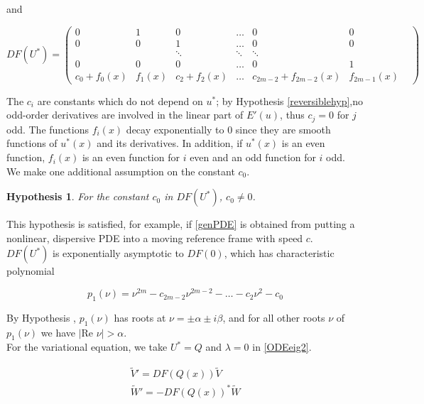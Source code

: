 \documentclass[12pt]{article}
\newtheorem{hypothesis}{Hypothesis}
\begin{document}
and 

\begin{equation}
DF(U^*) = \begin{pmatrix}
0 & 1 & 0 & \dots & 0 & 0 \\
0 & 0 & 1 & \dots & 0 & 0 \\
& & \ddots & \ddots & \ddots & & \\
0 & 0 & 0 & \dots & 0 & 1 \\
c_0 + f_0(x) & f_1(x) & c_2 + f_2(x) &
 \dots & c_{2m-2} + f_{2m-2}(x) & f_{2m-1}(x)
\end{pmatrix}
\end{equation}

The $c_i$ are constants which do not depend on $u^*$; by Hypothesis \ref{reversiblehyp},no odd-order derivatives are involved in the linear part of $E'(u)$, thus $c_j = 0$ for $j$ odd. The functions $f_i(x)$ decay exponentially to 0 since they are smooth functions of $u^*(x)$ and its derivatives. In addition, if $u^*(x)$ is an even function, $f_i(x)$ is an even function for $i$ even and an odd function for $i$ odd.\\

We make one additional assumption on the constant $c_0$.

\begin{hypothesis}\label{c0nonzero}
For the constant $c_0$ in $DF(U^*)$, $c_0 \neq 0$.
\end{hypothesis}

This hypothesis is satisfied, for example, if \eqref{genPDE} is obtained from putting a nonlinear, dispersive PDE into a moving reference frame with speed $c$. \\

$DF(U^*)$ is exponentially asymptotic to $DF(0)$, which has characteristic polynomial

\begin{equation}\label{charpolyDF0}
p_1(\nu) = \nu^{2m} - c_{2m-2} \nu^{2m-2} - \dots - c_2 \nu^2 - c_0
\end{equation}

By Hypothesis \label{hypeq}, $p_1(\nu)$ has roots at $\nu = \pm \alpha \pm i \beta$, and for all other roots $\nu$ of $p_1(\nu)$ we have $|\text{Re }\nu| > \alpha$.\\

For the variational equation, we take $U^* = Q$ and $\lambda = 0$ in \eqref{ODEeig2}.

\begin{align}
\tilde{V}' = DF(Q(x))\tilde{V} \label{vareq1} \\
\tilde{W}' = -DF(Q(x))^* \tilde{W} \label{adjvareq1}
\end{align}
\end{document}
